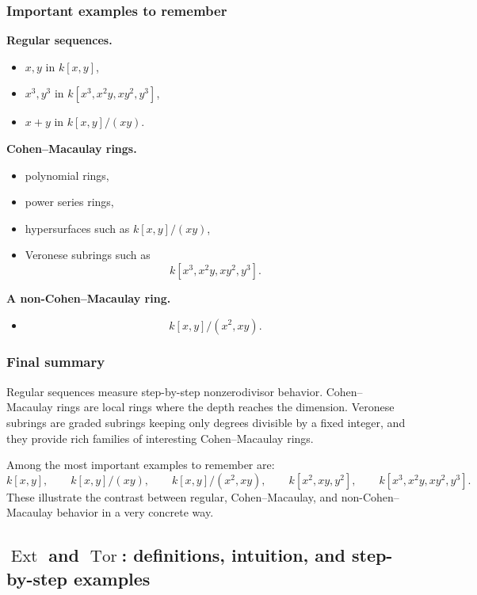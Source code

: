 \documentclass[12pt,a4paper]{article}
\theoremstyle{notespace}
\DeclareMathOperator{\Tor}{Tor}
\DeclareMathOperator{\Ext}{Ext}
\begin{document}
\subsubsection{Important examples to remember}

\textbf{Regular sequences.}
\begin{itemize}
	\item \(x,y\) in \(k[x,y]\),
	\item \(x^3,y^3\) in \(k[x^3,x^2y,xy^2,y^3]\),
	\item \(x+y\) in \(k[x,y]/(xy)\).
\end{itemize}

\textbf{Cohen--Macaulay rings.}
\begin{itemize}
	\item polynomial rings,
	\item power series rings,
	\item hypersurfaces such as \(k[x,y]/(xy)\),
	\item Veronese subrings such as
	\[
	k[x^3,x^2y,xy^2,y^3].
	\]
\end{itemize}

\textbf{A non-Cohen--Macaulay ring.}
\begin{itemize}
	\item
	\[
	k[x,y]/(x^2,xy).
	\]
\end{itemize}

\subsubsection{Final summary}

Regular sequences measure step-by-step nonzerodivisor behavior. Cohen--Macaulay rings are local rings where the depth reaches the dimension. Veronese subrings are graded subrings keeping only degrees divisible by a fixed integer, and they provide rich families of interesting Cohen--Macaulay rings.

Among the most important examples to remember are:
\[
k[x,y],\qquad k[x,y]/(xy),\qquad k[x,y]/(x^2,xy),\qquad k[x^2,xy,y^2],\qquad k[x^3,x^2y,xy^2,y^3].
\]
These illustrate the contrast between regular, Cohen--Macaulay, and non-Cohen--Macaulay behavior in a very concrete way.

\subsection{\(\Ext\) and \(\Tor\): definitions, intuition, and step-by-step examples}
\end{document}
